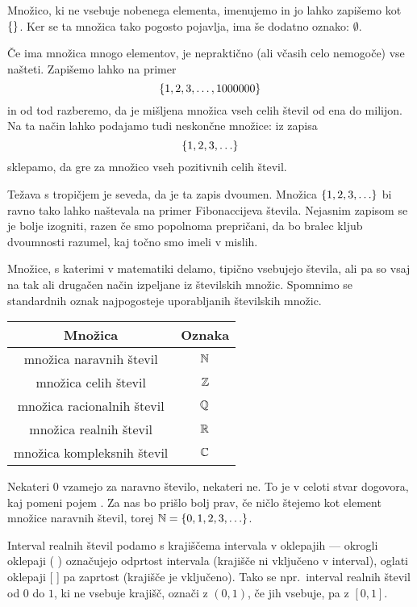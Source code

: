 		Množico, ki ne vsebuje nobenega elementa, imenujemo  in jo lahko zapišemo kot $\set{}$. Ker se ta množica tako pogosto pojavlja, ima še dodatno oznako: $\emptyset$.
		
		Če ima množica mnogo elementov, je nepraktično (ali včasih celo nemogoče) vse našteti. Zapišemo lahko na primer
		\[\set{1, 2, 3, \ldots, 1000000}\]
		in od tod razberemo, da je mišljena množica vseh celih števil od ena do milijon. Na ta način lahko podajamo tudi neskončne množice: iz zapisa
		\[\set{1, 2, 3, \ldots}\]
		sklepamo, da gre za množico vseh pozitivnih celih števil.
		
		Težava s tropičjem je seveda, da je ta zapis dvoumen. Množica $\set{1, 2, 3, \ldots}$ bi ravno tako lahko naštevala na primer Fibonaccijeva števila. Nejasnim zapisom se je bolje izogniti, razen če smo popolnoma prepričani, da bo bralec kljub dvoumnosti razumel, kaj točno smo imeli v mislih.
		
		Množice, s katerimi v matematiki delamo, tipično vsebujejo števila, ali pa so vsaj na tak ali drugačen način izpeljane iz številskih množic. Spomnimo se standardnih oznak najpogosteje uporabljanih številskih množic.
		\begin{center}
			\begin{tabular}{|cc|}
				\hline
				\textbf{Množica} & \textbf{Oznaka} \\
				\hline
				množica naravnih števil & $\mathbb{N}$ \\
				množica celih števil & $\mathbb{Z}$ \\
				množica racionalnih števil & $\mathbb{Q}$ \\
				množica realnih števil & $\mathbb{R}$ \\
				množica kompleksnih števil & $\mathbb{C}$ \\
				\hline
			\end{tabular}
		\end{center}
		
		Nekateri $0$ vzamejo za naravno število, nekateri ne. To je v celoti stvar dogovora, kaj pomeni pojem . Za nas bo prišlo bolj prav, če ničlo štejemo kot element množice naravnih števil, torej $\NN = \set{0, 1, 2, 3, \ldots}$.
		
		Interval realnih števil podamo s krajiščema intervala v oklepajih --- okrogli oklepaji ( ) označujejo odprtost intervala (krajišče ni vključeno v interval), oglati oklepaji [ ] pa zaprtost (krajišče je vključeno). Tako se npr.~interval realnih števil od $0$ do $1$, ki ne vsebuje krajišč, označi z $(0, 1)$, če jih vsebuje, pa z $[0, 1]$.
		
